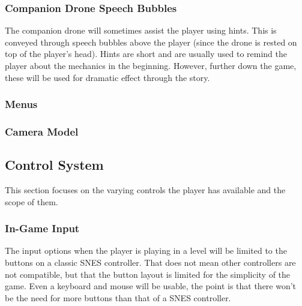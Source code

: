 \documentclass[12pt]{article}
\begin{document}
\subsubsection{Companion Drone Speech Bubbles}

The companion drone will sometimes assist the player using hints. This is conveyed through speech bubbles above the player (since the drone is rested on top of the player's head). Hints are short and are usually used to remind the player about the mechanics in the beginning. However, further down the game, these will be used for dramatic effect through the story.

\subsubsection{Menus}

\subsubsection{Camera Model}

\subsection{Control System}

This section focuses on the varying controls the player has available and the scope of them. 

\subsubsection{In-Game Input}

The input options when the player is playing in a level will be limited to the buttons on a classic SNES controller. That does not mean other controllers are not compatible, but that the button layout is limited for the simplicity of the game. Even a keyboard and mouse will be usable, the point is that there won't be the need for more buttons than that of a SNES controller. 
\end{document}
